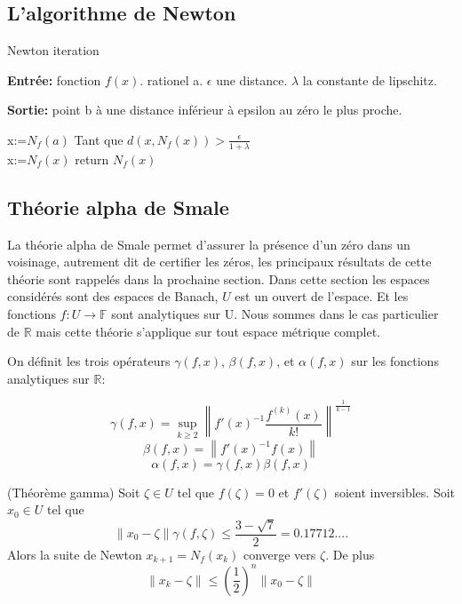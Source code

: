 \documentclass[a4paper,10.5pt]{article}
\begin{document}
	\subsection{L'algorithme de Newton}
	
	
	
	\begin{algorithm}
		\caption{Newton iteration}
		
		\vspace{2mm}
		
		\textbf{Entrée:} fonction $f(x)$. rationel a. $\epsilon$ une distance. $\lambda$ la constante de lipschitz.
		
		\textbf{Sortie:} point b à une distance inférieur à epsilon au zéro le plus proche. 
		
		\begin{algorithmic}[1]
			\STATE x:=$N_{f}(a)$
			\STATE Tant que $d(x,N_{f}(x))>\frac{\epsilon}{1+\lambda}$\\
					x:=$N_{f}(x)$					
			\STATE return $N_{f}(x)$
		\end{algorithmic}
	\end{algorithm}

	\subsection{Théorie alpha de Smale}
	La théorie alpha de Smale permet d'assurer la présence d'un zéro dans un voisinage, autrement dit de certifier les zéros, les principaux résultats de cette théorie sont rappelés dans la prochaine section.
	Dans cette section les espaces considérés sont des espaces de Banach, $U$ est un ouvert de l'espace. Et les fonctions $f:U\rightarrow \mathbb{F}$ sont analytiques sur U. Nous sommes dans le cas particulier de $\mathbb{R}$ mais cette théorie s'applique sur tout espace métrique complet. 
	
	\begin{definition}
		
		On définit les trois opérateurs $\gamma(f,x)$, $\beta(f,x)$, et $\alpha(f,x)$ sur les fonctions analytiques sur $\mathbb{R}$:
		
		\[\gamma(f,x)=\sup_{k \geq 2}\left\|f'(x)^{-1}\frac{f^{(k)}(x)}{k!}\right\|^{\frac{1}{k-1}}\]
		\[\beta(f,x)=\left\|f'(x)^{-1}f(x)\right\|\]
		\[\alpha(f,x)=\gamma(f,x)\beta(f,x)\]
	\end{definition}
	
	\begin{theorem}(Théorème gamma) Soit $\zeta \in U$ tel que $f(\zeta)=0$ et $f'(\zeta)$ soient inversibles. Soit $x_{0} \in U$ tel que \\
		\[\left\|x_{0}-\zeta\right\|\gamma(f,\zeta) \leq \frac{3-\sqrt{7}}{2}=0.17712.... \]
		Alors la suite de Newton $x_{k+1}=N_{f}(x_{k})$ converge vers $\zeta$. De plus\\
		\[\left\|x_{k}-\zeta\right\| \leq \left(\frac{1}{2}\right)^{n}\left\|x_{0}-\zeta\right\|\]
	\end{theorem}
	
\end{document}
